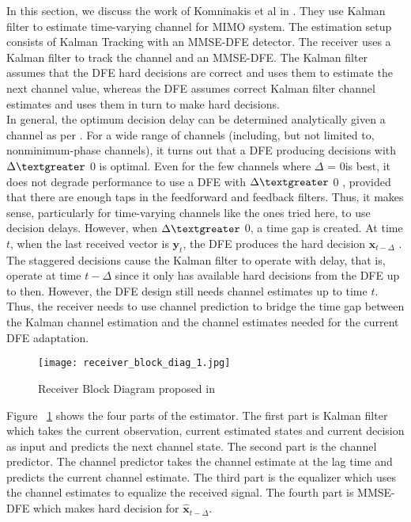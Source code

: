 In this section, we discuss the work of Komninakis et al in \cite{komninakis}. They use Kalman filter to estimate time-varying channel for MIMO system. The estimation setup consists of Kalman Tracking with an MMSE-DFE detector. The receiver uses a Kalman filter to track the channel and an MMSE-DFE. The Kalman filter assumes that the DFE hard decisions are correct and uses them to estimate the next channel value, whereas the DFE assumes correct Kalman filter channel estimates and uses them in turn to make hard decisions. \\
In general, the optimum decision delay can be determined analytically given a channel as per \cite{mimoofdmlinear} . For a wide range of channels (including, but not limited to, nonminimum-phase channels), it turns out that a DFE producing decisions with $\Delta \textgreater$ 0 is optimal. Even for the few channels where $\Delta$ = 0is best, it does not degrade performance to use a DFE with $\Delta \textgreater$ 0 , provided that there are enough taps in the feedforward and feedback filters. Thus, it makes sense, particularly for time-varying channels like the ones tried here, to use decision delays. However, when $\Delta \textgreater$ 0, a time gap is created. At time $t$, when the last received vector is $\boldsymbol{y} _t$, the DFE produces the hard decision $\hat{\boldsymbol{x}} _{t-\Delta}$ . The staggered decisions cause the Kalman filter to operate with delay, that is, operate at time $t-\Delta$ since it only has available hard decisions from the DFE up to then. However, the DFE design still needs channel estimates up to time $t$. Thus, the receiver needs to use channel prediction to bridge the time gap between the Kalman channel estimation and the channel estimates needed for the current DFE adaptation. \\
\begin{figure}[ht!]
\centering
\texttt{[image: receiver\_block\_diag\_1.jpg]}
\caption{Receiver Block Diagram proposed in \cite{komninakis}}
\label{fig:komninakis_implementation}
\end{figure}
Figure ~\ref{fig:komninakis_implementation} shows the four parts of the estimator. The first part is Kalman filter which takes the current observation, current estimated states and current decision as input and predicts the next channel state. The second part is the channel predictor. The channel predictor takes the channel estimate at the lag time and predicts the current channel estimate. The third part is the equalizer which uses the channel estimates to equalize the received signal. The fourth part is MMSE-DFE which makes hard decision for $\hat{\boldsymbol{x}} _{t-\Delta}$.\\
